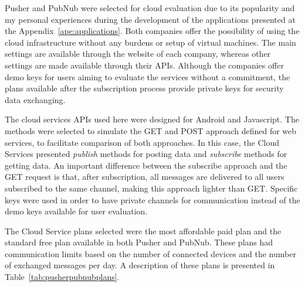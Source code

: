 Pusher and PubNub were selected for cloud evaluation due to its popularity and my personal experiences during the development of the applications presented at the Appendix~\ref{ape:applications}.
Both companies offer the possibility of using the cloud infrastructure without any burdens or setup of virtual machines.
The main settings are available through the website of each company, whereas other settings are made available through their APIs.
Although the companies offer demo keys for users aiming to evaluate the services without a commitment, the plans available after the subscription process provide private keys for security data exchanging. 

The cloud services APIs used here were designed for Android and Javascript.
The methods were selected to simulate the GET and POST approach defined for web services, to facilitate comparison of both approaches.
In this case, the Cloud Services presented \emph{publish} methods for posting data and \emph{subscribe} methods for getting data.
An important difference between the subscribe approach and the GET request is that, after subscription, all messages are delivered to all users subscribed to the same channel, making this approach lighter than GET. 
Specific keys were used in order to have private channels for communication instead of the demo keys available for user evaluation.

The Cloud Service plans selected were the most affordable paid plan and the standard free plan available in both Pusher and PubNub.
These plans had communication limits based on the number of connected devices and the number of exchanged messages per day.
A description of these plans is presented in Table~\ref{tab:pusherpubnubplans}.


